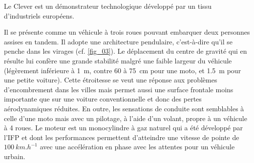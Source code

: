 \def\columnseprulecolor{\color{ocre}}
\setlength{\columnseprule}{0.4pt} 


\setcounter{exo}{0}

\ifprof
\else
\begin{multicols}{2}
\fi




Le Clever%
est un démonstrateur technologique développé par un tissu d'industriels européens.%

%

Il se présente comme un véhicule à trois roues pouvant embarquer deux personnes assises en tandem. Il adopte une architecture pendulaire, c'est-à-dire qu'il se penche dans les virages (cf. \autoref{fig_03}). Le déplacement du centre de gravité qui en résulte lui confère une grande stabilité malgré une faible largeur du véhicule (légèrement inférieure à \SI{1}{m}, contre 60 à \SI{75}{cm} pour une moto, et \SI{1,5}{m} pour une petite voiture). Cette étroitesse se veut une réponse aux problèmes d'encombrement dans les villes mais permet aussi une surface frontale moins importante que sur une voiture conventionnelle et donc des pertes aérodynamiques réduites. En outre, les sensations de conduite sont semblables à celle d'une moto mais avec un pilotage, à l'aide d'un volant, propre à un véhicule à 4 roues. Le moteur est un monocylindre à gaz naturel qui a été développé par l'IFP et dont les performances permettent d'atteindre une vitesse de pointe de $\SI{100}{km.h^{-1}}$ avec une accélération en phase avec les attentes pour un véhicule urbain.


\end{multicols}
